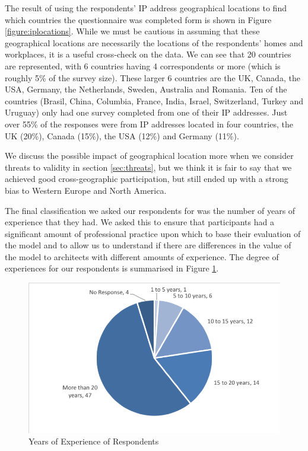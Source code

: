 The result of using the respondents' IP address geographical locations to find which countries the questionnaire was completed form is shown in Figure \ref{figure:iplocations}.  While we must be cautious in assuming that these geographical locations are necessarily the locations of the respondents' homes and workplaces, it is a useful cross-check on the data.  We can see that 20 countries are represented, with 6 countries having 4 correspondents or more (which is roughly 5\% of the survey size).  These larger 6 countries are the UK, Canada, the USA, Germany, the Netherlands, Sweden, Australia and Romania.  Ten of the countries (Brasil, China, Columbia, France, India, Israel, Switzerland, Turkey and Uruguay) only had one survey completed from one of their IP addresses.  Just over 55\% of the responses were from IP addresses located in four countries, the UK (20\%), Canada (15\%), the USA (12\%) and Germany (11\%).

We discuss the possible impact of geographical location more when we consider threats to validity in section \ref{sec:threats}, but we think it is fair to say that we achieved good cross-geographic participation, but still ended up with a strong bias to Western Europe and North America.

The final classification we asked our respondents for was the number of years of experience that they had.  We asked this to ensure that participants had a significant amount of professional practice upon which to base their evaluation of the model and to allow us to understand if there are differences in the value of the model to architects with different amounts of experience.  The degree of experiences for our respondents is summarised in Figure \ref{figure:yearsexp}.
 
\begin{figure}
\centering
\includegraphics[width=12cm,trim={2 2 2 2},clip]{Figures/prioritisation-yearsexp-detailed}
\caption{Years of Experience of Respondents}
\label{figure:yearsexp}
\end{figure}

